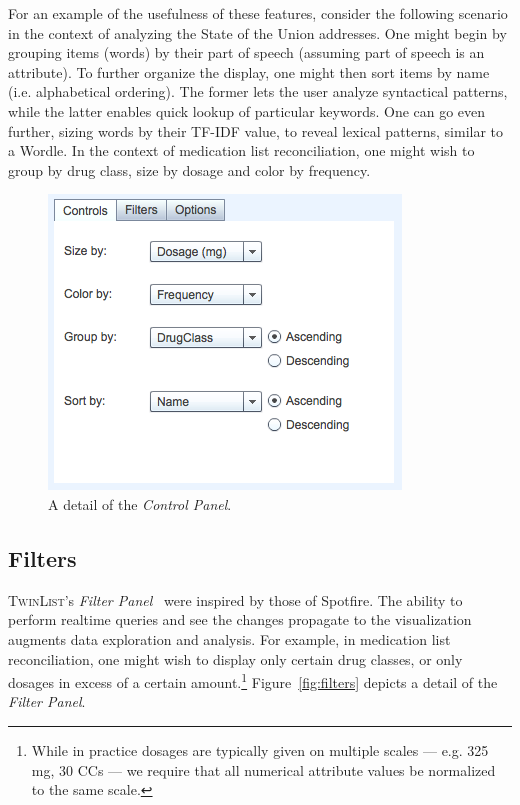 \documentclass{chi2009}
\newcommand{\TwinList}{\textsc{TwinList}}
\newcommand{\Controls}{\textit{Control Panel}}
\newcommand{\Filters}{\textit{Filter Panel}}
\begin{document}
For an example of the usefulness of these features, consider the following scenario in the context of analyzing the State of the Union addresses. One might begin by grouping items (words) by their part of speech (assuming part of speech is an attribute). To further organize the display, one might then sort items by name (i.e. alphabetical ordering). The former lets the user analyze syntactical patterns, while the latter enables quick lookup of particular keywords. One can go even further, sizing words by their TF-IDF value, to reveal lexical patterns, similar to a Wordle\cite{Viegas2009}. In the context of medication list reconciliation, one might wish to group by drug class, size by dosage and color by frequency.
 
\begin{figure}
\begin{center}
\includegraphics[width=1\linewidth]{img/controls.png}
\end{center}
   \caption{A detail of the \Controls.}
   \label{fig:controls}
\end{figure}

\subsection{Filters}
\TwinList's \Filters~ were inspired by those of Spotfire\cite{Ahlberg1996}. The ability to perform realtime queries and see the changes propagate to the visualization augments data exploration and analysis. For example, in medication list reconciliation, one might wish to display only certain drug classes, or only dosages in excess of a certain amount.\footnote{While in practice dosages are typically given on multiple scales --- e.g. 325 mg, 30 CCs --- we require that all numerical attribute values be normalized to the same scale.} Figure~\ref{fig:filters} depicts a detail of the \Filters.
\end{document}
